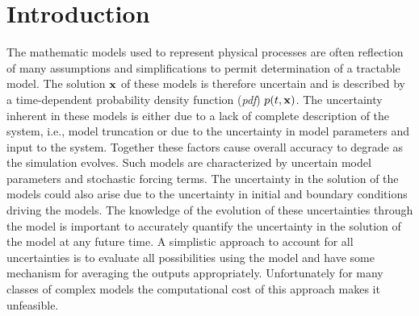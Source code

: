 \documentclass[10pt, conference]{IEEEtran}
\begin{document}
\section{Introduction}
The mathematic models used to represent physical processes are often reflection of many assumptions and simplifications to permit determination of a tractable model. The solution $\mathbf{x}$ of these models is therefore uncertain and is described by a time-dependent probability density function (\textit{pdf}) $p(t,\mathbf{x})$. The uncertainty inherent in these models is either due to a lack of complete description of the system, i.e., model truncation or due to the uncertainty in model parameters and input to the system. Together these factors cause overall accuracy to degrade as the simulation evolves. Such models are characterized by uncertain model parameters and stochastic forcing terms. The uncertainty in the solution of the models could also arise due to the uncertainty in initial and boundary conditions driving the models. The knowledge of the evolution of these uncertainties through the model is important to accurately quantify the uncertainty in the solution of the model at any future time. A simplistic approach to account for all uncertainties is to evaluate all possibilities using the model and have some mechanism for averaging the outputs appropriately. Unfortunately for many classes of complex models the computational cost of this approach makes it unfeasible.
\end{document}
